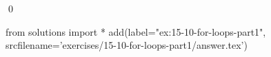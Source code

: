
\begin{ex}
  \label{ex:15-10-for-loops-part1}
  
  \qed
\end{ex}
\begin{python0}
from solutions import *
add(label="ex:15-10-for-loops-part1",
    srcfilename='exercises/15-10-for-loops-part1/answer.tex')
\end{python0}
